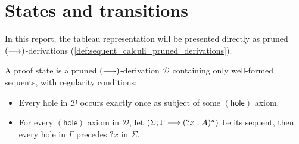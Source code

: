 \documentclass[twoside]{report}
\begin{document}



\section{States and transitions}
\label{sec:tableau_states_and_transitions}

In this report, the tableau representation will be presented directly as pruned $(\longrightarrow)$-derivations (\cref{def:sequent_calculi_pruned_derivations}).

\begin{definition}
    \label{def:tableau_states}
    A proof state is a pruned $(\longrightarrow)$-derivation $\mathcal D$ containing only well-formed sequents, with regularity conditions:
    \begin{itemize}
        \item Every hole in $\mathcal D$ occurs exactly once as subject of some $(\mathsf{hole})$ axiom.
        \item For every $(\mathsf{hole})$ axiom in $\mathcal D$, let $(\Sigma; \Gamma \longrightarrow ({?x} : A)^u)$ be its sequent, then every hole in $\Gamma$ precedes ${?x}$ in $\Sigma$.
    \end{itemize}
\end{definition}
\end{document}
